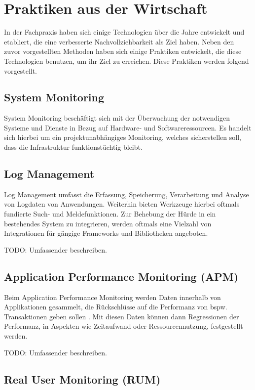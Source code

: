 \section{Praktiken aus der Wirtschaft}

In der Fachpraxis haben sich einige Technologien über die Jahre entwickelt und etabliert, die eine verbesserte Nachvollziehbarkeit als Ziel haben. Neben den zuvor vorgestellten Methoden haben sich einige Praktiken entwickelt, die diese Technologien benutzen, um ihr Ziel zu erreichen. Diese Praktiken werden folgend vorgestellt.

\subsection{System Monitoring}

System Monitoring beschäftigt sich mit der Überwachung der notwendigen Systeme und Dienste in Bezug auf Hardware- und Softwareressourcen. Es handelt sich hierbei um ein projektunabhängiges Monitoring, welches sicherstellen soll, dass die Infrastruktur funktionstüchtig bleibt.

\subsection{Log Management}

Log Management umfasst die Erfassung, Speicherung, Verarbeitung und Analyse von Logdaten von Anwendungen. Weiterhin bieten Werkzeuge hierbei oftmals fundierte Such- und Meldefunktionen. Zur Behebung der Hürde in ein bestehendes System zu integrieren, werden oftmals eine Vielzahl von Integrationen für gängige Frameworks und Bibliotheken angeboten.

{\color{red}TODO: Umfassender beschreiben.}

\subsection{Application Performance Monitoring (APM)}

Beim Application Performance Monitoring werden Daten innerhalb von Applikationen gesammelt, die Rückschlüsse auf die Performanz von bspw. Transaktionen geben sollen \cite{StudyingTheEffectivenessOfAPMTools}. Mit diesen Daten können dann Regressionen der Performanz, in Aspekten wie Zeitaufwand oder Ressourcennutzung, festgestellt werden.

{\color{red}TODO: Umfassender beschreiben.}

\subsection{Real User Monitoring (RUM)}

